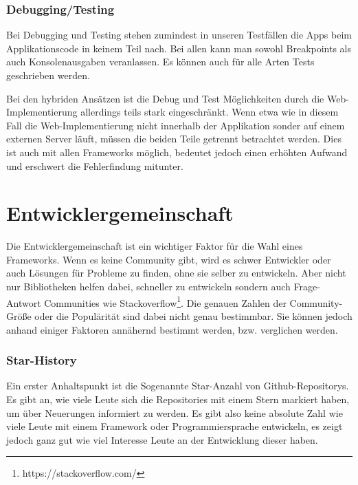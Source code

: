 \subsubsection{Debugging/Testing}
Bei Debugging und Testing stehen zumindest in unseren Testfällen die Apps beim Applikationscode in keinem Teil nach. Bei allen kann man sowohl Breakpoints als auch Konsolenausgaben veranlassen. Es können auch für alle Arten Tests geschrieben werden.

Bei den hybriden Ansätzen ist die Debug und Test Möglichkeiten  durch die Web-Implementierung allerdings teils stark eingeschränkt. Wenn etwa wie in diesem Fall die Web-Implementierung nicht innerhalb der Applikation sonder auf einem externen Server läuft, müssen die beiden Teile getrennt betrachtet werden. Dies ist auch mit allen Frameworks möglich, bedeutet jedoch einen erhöhten Aufwand und erschwert die Fehlerfindung mitunter.

\section{Entwicklergemeinschaft}
Die Entwicklergemeinschaft ist ein wichtiger Faktor für die Wahl eines Frameworks. Wenn es keine Community gibt, wird es schwer Entwickler oder auch Lösungen für Probleme zu finden, ohne sie selber zu entwickeln. Aber nicht nur Bibliotheken helfen dabei, schneller zu entwickeln sondern auch Frage-Antwort Communities wie Stackoverflow\footnote{https://stackoverflow.com/}.  Die genauen Zahlen der Community-Größe oder die Populärität sind dabei nicht genau bestimmbar. Sie können jedoch anhand einiger Faktoren annähernd bestimmt werden, bzw. verglichen werden.

\subsubsection{Star-History}

Ein erster Anhaltspunkt ist die Sogenannte Star-Anzahl von Github-Repositorys. Es gibt an, wie viele Leute sich die Repositories mit einem Stern markiert haben, um über Neuerungen informiert zu werden. Es gibt also keine absolute Zahl wie viele Leute mit einem Framework oder Programmiersprache entwickeln, es zeigt jedoch ganz gut wie viel Interesse Leute an der Entwicklung dieser haben.

